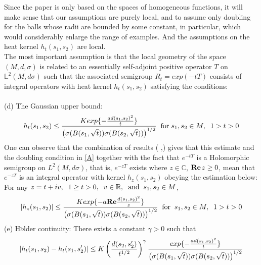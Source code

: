 \documentclass[10pt]{article}
\theoremstyle{definition}
\numberwithin{equation}{section}
\begin{document}
	Since the paper is only based on the spaces of homogeneous functions, it will make sense that our assumptions are purely local, and to assume only doubling for the balls whose radii are bounded by some constant, in particular, which would considerably enlarge the range of examples. And the assumptions on the heat kernel $h_t(s_1,s_2)$ are local.\\
	The most important assumption is that the local geometry of the space $ (M,d,\sigma) $ is related to an essentially self-adjoint positive operator $T$ on $\mathbb{L}^2 (M, d \sigma)$ such that the associated semigroup $R_t = exp{(-tT)} $ consists of integral operators with heat kernel $ h_t (s_1,s_2)$ satisfying the conditions:\\
	\\
	(d) The Gaussian upper bound:
	\begin{equation}\label{H}
		h_t (s_1,s_2) \leq \frac{K exp \{- \frac{ad (s_1,s_2)^2}{t} \}}{\left(\sigma (B(s_1, \sqrt{t}))\sigma (B(s_2, \sqrt{t})) \right)^{1/2}} \hspace{0.2 cm} \mbox{for} \hspace{0.1 cm} s_1,s_2 \in M, \hspace{0.2 cm} 1>t>0
	\end{equation}
	One can observe that the combination of results  (\cite{Ouhabaz} \cite{Coulhon3} \cite{Coulhon1},\cite{Coulhon2}) gives that this estimate and the doubling condition in \eqref{A} together with the fact that $ e^{-tT}$ is a Holomorphic semigroup on $L^2 (M, d \sigma)$, that is, $ e^{-zT} $ exists where $z \in \mathbb{C}$, $\textbf{Re} \hspace{0.05 cm} z  \geq 0$, mean that $ e^{-zT} $ is an integral operator with kernel $ h_z (s_1,s_2)$ obeying the estimation below: For any
	$ z = t +iv, \hspace{0.2 cm} 1\geq t>0, \hspace{0.2 cm} v \in \mathbb{R}, \hspace{0.2 cm} \mbox{and} \hspace{0.2 cm} s_1,s_2 \in M$,
	\begin{equation}
		\arrowvert	h_z (s_1,s_2) \arrowvert \leq \frac{K exp\{-a \textbf{Re} \frac{d(s_1,s_2)^2}{z}\}}{\left(\sigma (B(s_1, \sqrt{t}))\sigma (B(s_2, \sqrt{t}))\right)^{1/2}} \;\; \mbox{for} \;\; s_1,s_2 \in M, \;\; 1>t>0
	\end{equation}
	(e) H$\ddot{o}$lder continuity: There exists a constant $\gamma >0 $ such that
	\begin{equation}
		\arrowvert	h_t (s_1,s_2) - h_t (s_1,s_2^{\prime})\arrowvert \leq K \left ( \frac{d(s_2,s_2^{\prime})}{t^{1/2}}\right)^{\gamma} \frac{exp \{- \frac{a d(s_1,s_2)^2}{t}\}}{\left(\sigma (B(s_1, \sqrt{t}))\sigma (B(s_2, \sqrt{t}))\right)^{1/2}} \end{equation}
\end{document}
